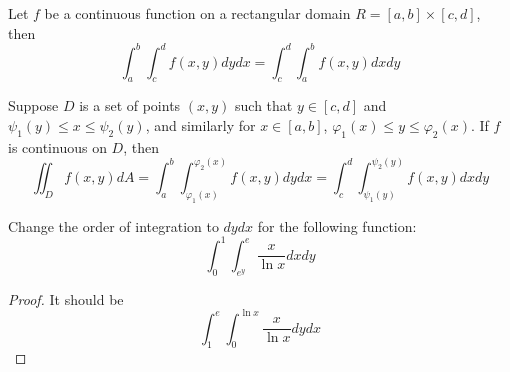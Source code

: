 \documentclass[openany]{book}
\begin{document}
\begin{prop}
    Let $f$ be a continuous function on a rectangular domain $R=[a,b]\times[c,d]$, then 
    \begin{equation*}
        \int_a^b\int_c^df(x,y)dydx=\int_c^d\int_a^bf(x,y)dxdy
    \end{equation*}
\end{prop}

\begin{prop}
    Suppose $D$ is a set of points $(x,y)$ such that $y\in [c,d]$ and $\psi_1(y)\leq x\leq\psi_2(y)$, and similarly for $x\in [a,b]$, $\varphi_1(x)\leq y\leq\varphi_2(x)$. If $f$ is continuous on $D$, then 
    \begin{equation*}
        \iint_Df(x,y)dA=\int_a^b\int_{\varphi_1(x)}^{\varphi_2(x)}f(x,y)dydx=\int_c^d\int_{\psi_1(y)}^{\psi_2(y)}f(x,y)dxdy
    \end{equation*}
\end{prop}

\begin{prob}
    Change the order of integration to $dydx$ for the following function:
    \begin{equation*}
        \int_0^1\int_{e^y}^{e}\frac{x}{\ln x}dxdy
    \end{equation*}
\end{prob}
\begin{proof}
    It should be 
    \begin{equation*}
        \int_1^e\int_{0}^{\ln x}\frac{x}{\ln x}dydx
    \end{equation*}
\end{proof}
\end{document}
